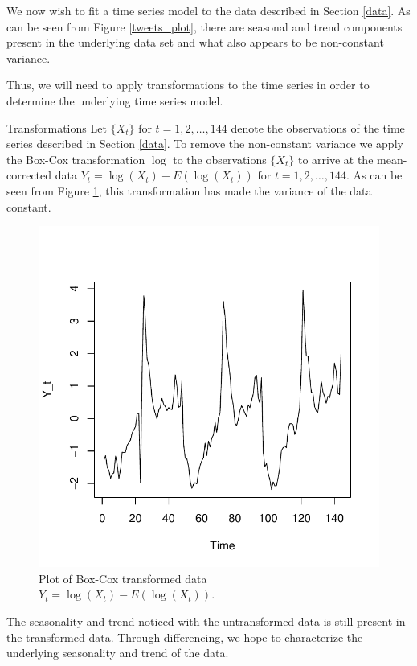 We now wish to fit a time series model to the data described in Section \ref{data}.
As can be seen from Figure \ref{tweets_plot}, there are seasonal and trend components
present in the underlying data set and what also appears to be non-constant variance.

Thus, we will need to apply transformations to the time series in order to determine
the underlying time series model.

\begin{subsection}{Transformations}\label{transformations}
  Let $\{X_t\}$ for $t=1,2,\dots, 144$ denote the observations
  of the time series described in Section \ref{data}. To remove the non-constant variance
  we apply the Box-Cox transformation $\log$ to the observations $\{X_t\}$ to arrive
  at the mean-corrected data $Y_t = \log(X_t) - E(\log(X_t))$ for $t=1,2,\dots, 144$.
  As can be seen from Figure \ref{log_plot}, this transformation has made the variance
  of the data constant.

  \begin{figure}[!h]
    \centerline{\includegraphics[scale=0.75]{../analysis/plots/log_plot}}
    \caption{Plot of Box-Cox transformed data $Y_t = \log(X_t) - E(\log(X_t))$.}\label{log_plot}
  \end{figure}

  The seasonality and trend noticed with the untransformed data is still present in
  the transformed data. Through differencing, we hope to characterize the underlying
  seasonality and trend of the data.


\end{subsection}
